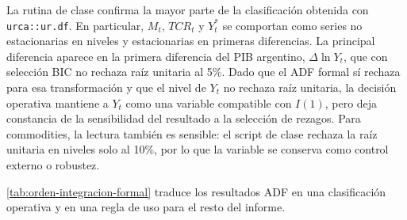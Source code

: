 \documentclass[11pt,a4paper]{article}
\begin{document}
	La rutina de clase confirma la mayor parte de la clasificación obtenida con
	\texttt{urca::ur.df}. En particular, \(M_t\), \(TCR_t\) y \(Y_t^*\) se
	comportan como series no estacionarias en niveles y estacionarias en primeras
	diferencias. La principal diferencia aparece en la primera diferencia del PIB
	argentino, \(\Delta \ln Y_t\), que con selección BIC no rechaza raíz unitaria al
	5\%. Dado que el ADF formal sí rechaza para esa transformación y que el nivel de
	\(Y_t\) no rechaza raíz unitaria, la decisión operativa mantiene a \(Y_t\) como
	una variable compatible con \(I(1)\), pero deja constancia de la sensibilidad
	del resultado a la selección de rezagos. Para commodities, la lectura también
	es sensible: el script de clase rechaza la raíz unitaria en niveles solo al
	10\%, por lo que la variable se conserva como control externo o robustez.

	\autoref{tab:orden-integracion-formal} traduce los resultados ADF en una
	clasificación operativa y en una regla de uso para el resto del informe.

	\begin{table}[H]
		\centering
		\caption{Clasificación integrada de raíces unitarias y uso econométrico.}
		\label{tab:orden-integracion-formal}
		\scriptsize
		\caption*{\footnotesize Fuente:
			.}
	\end{table}
\end{document}

